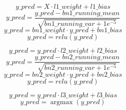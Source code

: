 \documentclass[20pt]{article}
\DeclareMathOperator*{\argmax}{\arg\max}   %
\begin{document}
    
    $$ y\_pred = X \cdot l1\_weight + l1\_bias $$
    $$ y\_pred = \frac{y\_pred - bn1\_running\_mean}{\sqrt{bn1\_running\_var + 1e^{-5}}} $$
    $$ y\_pred = bn1\_weight \cdot y\_pred + bn1\_bias $$
    $$ y\_pred = relu(y\_pred) $$
    
    
    $$ y\_pred = y\_pred \cdot l2\_weight + l2\_bias $$
    $$ y\_pred = \frac{y\_pred - bn2\_running\_mean}{\sqrt{bn2\_running\_var + 1e^{-5}}} $$
    $$ y\_pred = bn2\_weight \cdot y\_pred + bn2\_bias $$
    $$ y\_pred = relu(y\_pred) $$

    $$ y\_pred = y\_pred \cdot l3\_weight + l3\_bias $$
    $$ y\_pred = \argmax(y\_pred) $$
    
    
\end{document}
